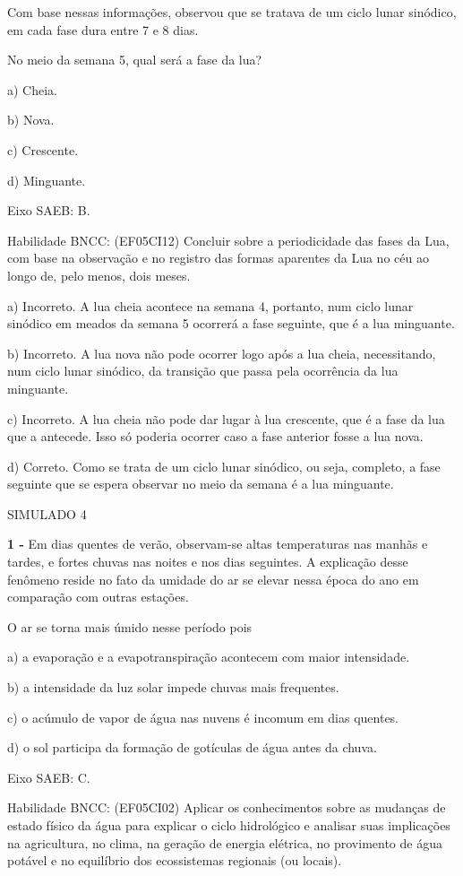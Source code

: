 Com base nessas informações, observou que se tratava de um ciclo lunar
sinódico, em cada fase dura entre 7 e 8 dias.

No meio da semana 5, qual será a fase da lua?

a) Cheia.

b) Nova.

c) Crescente.

d) Minguante.

Eixo SAEB: B.

Habilidade BNCC: (EF05CI12) Concluir sobre a periodicidade das fases da
Lua, com base na observação e no registro das formas aparentes da Lua no
céu ao longo de, pelo menos, dois meses.

a) Incorreto. A lua cheia acontece na semana 4, portanto, num ciclo
lunar sinódico em meados da semana 5 ocorrerá a fase seguinte, que é a
lua minguante.

b) Incorreto. A lua nova não pode ocorrer logo após a lua cheia,
necessitando, num ciclo lunar sinódico, da transição que passa pela
ocorrência da lua minguante.

c) Incorreto. A lua cheia não pode dar lugar à lua crescente, que é a
fase da lua que a antecede. Isso só poderia ocorrer caso a fase anterior
fosse a lua nova.

d) Correto. Como se trata de um ciclo lunar sinódico, ou seja, completo,
a fase seguinte que se espera observar no meio da semana é a lua
minguante.

\protect\hypertarget{_vei2hva2tu8x}{}{}SIMULADO 4

\textbf{1 -} Em dias quentes de verão, observam-se altas temperaturas
nas manhãs e tardes, e fortes chuvas nas noites e nos dias seguintes. A
explicação desse fenômeno reside no fato da umidade do ar se elevar
nessa época do ano em comparação com outras estações.

O ar se torna mais úmido nesse período pois

a) a evaporação e a evapotranspiração acontecem com maior intensidade.

b) a intensidade da luz solar impede chuvas mais frequentes.

c) o acúmulo de vapor de água nas nuvens é incomum em dias quentes.

d) o sol participa da formação de gotículas de água antes da chuva.

Eixo SAEB: C.

Habilidade BNCC: (EF05CI02) Aplicar os conhecimentos sobre as mudanças
de estado físico da água para explicar o ciclo hidrológico e analisar
suas implicações na agricultura, no clima, na geração de energia
elétrica, no provimento de água potável e no equilíbrio dos ecossistemas
regionais (ou locais).

